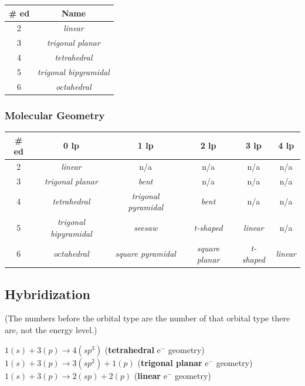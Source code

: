 \documentclass[a4paper, 12pt]{article}
\begin{document}
\begin{centering}

\begin{tabular}{c|c}
    \textbf{\# ed} & \textbf{Name} \\\hline
    2 & \textit{linear} \\
    3 & \textit{trigonal planar} \\
    4 & \textit{tetrahedral} \\
    5 & \textit{trigonal bipyramidal} \\
    6 & \textit{octahedral}
\end{tabular}

\end{centering}

\subsubsection*{Molecular Geometry}
\begin{centering}

\begin{tabular}{c|c|c|c|c|c}
    \textbf{\# ed} & \textbf{0 lp} & \textbf{1 lp} & \textbf{2 lp} & \textbf{3 lp} & \textbf{4 lp} \\\hline
    2 & \textit{linear} & n/a & n/a & n/a & n/a \\
    3 & \textit{trigonal planar} & \textit{bent} & n/a & n/a & n/a \\
    4 & \textit{tetrahedral} & \textit{trigonal pyramidal} & \textit{bent} & n/a & n/a \\
    5 & \textit{trigonal bipyramidal} & \textit{seesaw} & \textit{t-shaped} & \textit{linear} & n/a \\
    6 & \textit{octahedral} & \textit{square pyramidal} & \textit{square planar} & \textit{t-shaped} & \textit{linear}
\end{tabular}

\end{centering}

\subsection*{Hybridization}
(The numbers before the orbital type are the number of that orbital type there are, not the energy level.)
 
$1(s) + 3(p) \xrightarrow{} 4(sp^3)$ (\textbf{tetrahedral} e$^-$ geometry)
\\
$1(s) + 3(p) \xrightarrow{} 3(sp^2) + 1(p)$ (\textbf{trigonal planar} e$^-$ geometry)
\\
$1(s) + 3(p) \xrightarrow{} 2(sp) + 2(p)$ (\textbf{linear} e$^-$ geometry)
\end{document}
